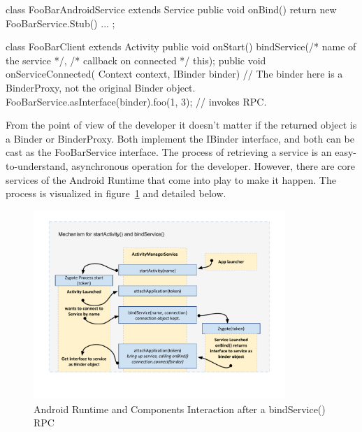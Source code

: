 \documentclass[prodmode]{acmlarge}
\begin{document}
\begin{snippet}
class FooBarAndroidService extends Service {
  public void onBind() { return new FooBarService.Stub() { ... }; }
}

class FooBarClient extends Activity {
  public void onStart() { bindService(/* name of the service */,
                                      /* callback on connected */ this);
  }
  public void onServiceConnected(
    Context context, IBinder binder) {
    // The binder here is a BinderProxy, not the original Binder object.
    FooBarService.asInterface(binder).foo(1, 3);  // invokes RPC.
  }
}
\end{snippet}

From the point of view of the developer it doesn't matter if the returned object is a Binder or BinderProxy. Both implement the IBinder interface, and both can be cast as the FooBarService interface. The process of retrieving a service is an easy-to-understand, asynchronous operation for the developer. However, there are core services of the Android Runtime that come into play to make it happen. The process is visualized in figure~\ref{fig:BindService} and detailed below.

\begin{figure}[h]
\centering
\includegraphics[width=0.85\textwidth]{drawings/bindService.pdf}
\caption{Android Runtime and Components Interaction after a bindService() RPC}
\label{fig:BindService}
\end{figure}
\end{document}
